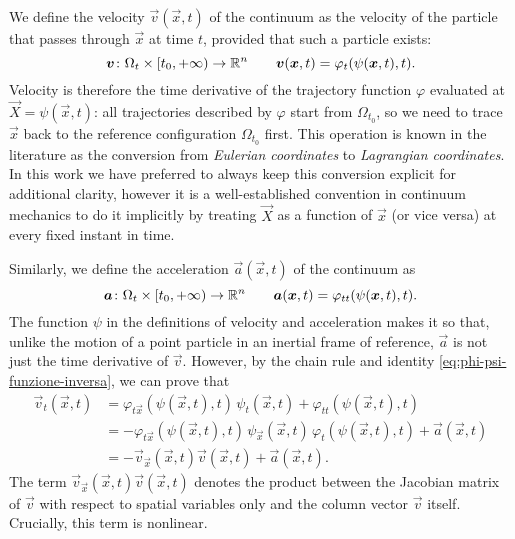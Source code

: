 We define the velocity $\vec{v}(\vec{x},t)$ of the continuum as the
velocity of the particle that passes through $\vec{x}$ at time $t$,
provided that such a particle exists:
\[
\bm{v} \colon \Omega_t \times [t_0,+\infty) \to \mathbb{R}^n
\qquad \bm{v}(\bm{x},t) = \varphi_t(\psi(\bm{x},t),t).
\]
Velocity is therefore the time derivative of the trajectory function $\varphi$
evaluated at $\vec{X} = \psi(\vec{x},t)$: all trajectories described by $\varphi$
start from $\Omega_{t_0}$, so we need to trace $\vec{x}$ back to the reference
configuration $\Omega_{t_0}$ first. This operation is known in the literature as
the conversion from \emph{Eulerian coordinates} to \emph{Lagrangian coordinates}.
In this work we have preferred to always keep this conversion explicit
for additional clarity, however it is a well-established convention in continuum
mechanics to do it implicitly by treating $\vec{X}$ as a function of $\vec{x}$
(or vice versa) at every fixed instant in time.

Similarly, we define the acceleration $\vec{a}(\vec{x},t)$ of the continuum as
\[
\bm{a} \colon \Omega_t \times [t_0,+\infty) \to \mathbb{R}^n
\qquad \bm{a}(\bm{x},t) = \varphi_{tt}(\psi(\bm{x},t),t).
\]
The function $\psi$ in the definitions of velocity and acceleration
makes it so that, unlike the motion of a point particle in an inertial
frame of reference, $\vec{a}$ is not just the time derivative of $\vec{v}$.
However, by the chain rule and identity \eqref{eq:phi-psi-funzione-inversa},
we can prove that
\begin{align} \label{eq:derivata-euleriana-u}
\vec{v}_t(\vec{x},t)
&= \varphi_{t\vec{x}}(\psi(\vec{x},t),t) \, \psi_t(\vec{x},t)
 + \varphi_{tt}(\psi(\vec{x},t),t) \nonumber \\
&= - \varphi_{t\vec{x}}(\psi(\vec{x},t),t) \, \psi_{\vec{x}}(\vec{x},t)
\, \varphi_t(\psi(\vec{x},t),t) + \vec{a}(\vec{x},t) \nonumber \\
&= -\vec{v}_{\vec{x}}(\vec{x},t) \vec{v}(\vec{x},t) + \vec{a}(\vec{x},t).
\end{align}
The term $\vec{v}_{\vec{x}}(\vec{x},t) \vec{v}(\vec{x},t)$ denotes the
product between the Jacobian matrix of $\vec{v}$ with respect to
spatial variables only and the column vector $\vec{v}$ itself.
Crucially, this term is nonlinear.

